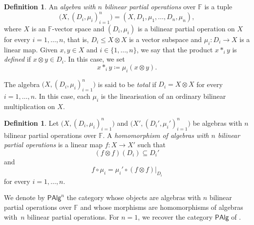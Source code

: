 \documentclass[reqno,a4paper]{amsart}
\theoremstyle{plain}
\theoremstyle{definition}
\newtheorem{definition}[subsection]{Definition}
\theoremstyle{remark}
\numberwithin{equation}{section}
\newcommand{\F}{\mathbb{F}}
\newcommand{\PAlg}{\ensuremath{\mathsf{PAlg}}}
\begin{document}
\begin{definition}
An \emph{algebra with $n$ bilinear partial operations} over $\F$ is a tuple
\[
\bigl(X,(D_i,\mu_i)_{i=1}^n\bigr)=(X,D_1,\mu_1,\ldots,D_n,\mu_n),
\]
where $X$ is an $\F$-vector space and $(D_i,\mu_i)$ is a bilinear partial operation on $X$ for every $i=1,\ldots,n$, that is, $D_i\leq X\otimes X$ is a vector subspace and $\mu_i\colon D_i\to X$ is a linear map. Given $x,y\in X$ and $i\in\{1,\ldots,n\}$, we say that the product $x\ast_i y$ is \emph{defined} if $x\otimes y\in D_i$. In this case, we set
\[
x\ast_i y\coloneqq\mu_i(x\otimes y).
\]

The algebra $\bigl(X,(D_i,\mu_i)_{i=1}^n\bigr)$ is said to be \emph{total} if $D_i=X\otimes X$ for every $i=1,\ldots,n$. In this case, each $\mu_i$ is the linearisation of an ordinary bilinear multiplication on $X$.
\end{definition}

\begin{definition}
Let $\bigl(X,(D_i,\mu_i)_{i=1}^n\bigr)$ and $\bigl(X',(D_i',\mu_i')_{i=1}^n\bigr)$ be algebras with $n$ bilinear partial operations over $\F$. A \emph{homomorphism of algebras with $n$ bilinear partial operations} is a linear map $f\colon X\to X'$ such that
\[
(f\otimes f)(D_i)\subseteq D_i'
\]
and
\[
f\circ\mu_i=\mu_i'\circ\left.(f\otimes f)\right|_{D_i}
\]
for every $i=1,\ldots,n$.
\end{definition}

We denote by $\PAlg^n$ the category whose objects are algebras with $n$ bilinear partial operations over $\F$ and whose morphisms are homomorphisms of algebras with~$n$ bilinear partial operations. For $n=1$, we recover the category $\PAlg$ of .
\end{document}
